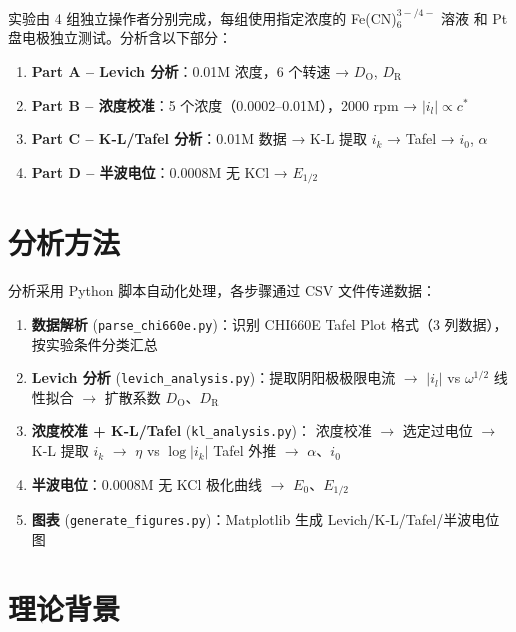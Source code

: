 \documentclass[12pt,a4paper]{ctexart}
\begin{document}
实验由 4 组独立操作者分别完成，每组使用指定浓度的 Fe(CN)$_6^{3-/4-}$ 溶液
和 Pt 盘电极独立测试。分析含以下部分：

\begin{enumerate}[leftmargin=1.5cm]
  \item \textbf{Part A -- Levich 分析}：0.01M 浓度，6 个转速 → $D_{\text{O}}$, $D_{\text{R}}$
  \item \textbf{Part B -- 浓度校准}：5 个浓度（0.0002--0.01M），2000 rpm → $|i_l| \propto c^*$
  \item \textbf{Part C -- K-L/Tafel 分析}：0.01M 数据 → K-L 提取 $i_k$ → Tafel → $i_0$, $\alpha$
  \item \textbf{Part D -- 半波电位}：0.0008M 无 KCl → $E_{1/2}$
\end{enumerate}

\newpage

\section{分析方法}

分析采用 Python 脚本自动化处理，各步骤通过 CSV 文件传递数据：

\begin{enumerate}[leftmargin=1.5cm]
  \item \textbf{数据解析} (\texttt{parse\_chi660e.py})：识别 CHI660E Tafel Plot 格式（3 列数据），
  按实验条件分类汇总
  \item \textbf{Levich 分析} (\texttt{levich\_analysis.py})：提取阴阳极极限电流 $\rightarrow$
  $|i_l|$ vs $\omega^{1/2}$ 线性拟合 $\rightarrow$ 扩散系数 $D_{\text{O}}$、$D_{\text{R}}$
  \item \textbf{浓度校准 + K-L/Tafel} (\texttt{kl\_analysis.py})：
  浓度校准 $\rightarrow$ 选定过电位 $\rightarrow$ K-L 提取 $i_k$
  $\rightarrow$ $\eta$ vs $\log|i_k|$ Tafel 外推 $\rightarrow$ $\alpha$、$i_0$
  \item \textbf{半波电位}：0.0008M 无 KCl 极化曲线 $\rightarrow$ $E_0$、$E_{1/2}$
  \item \textbf{图表} (\texttt{generate\_figures.py})：Matplotlib 生成 Levich/K-L/Tafel/半波电位图
\end{enumerate}

\newpage

\section{理论背景}
\end{document}
